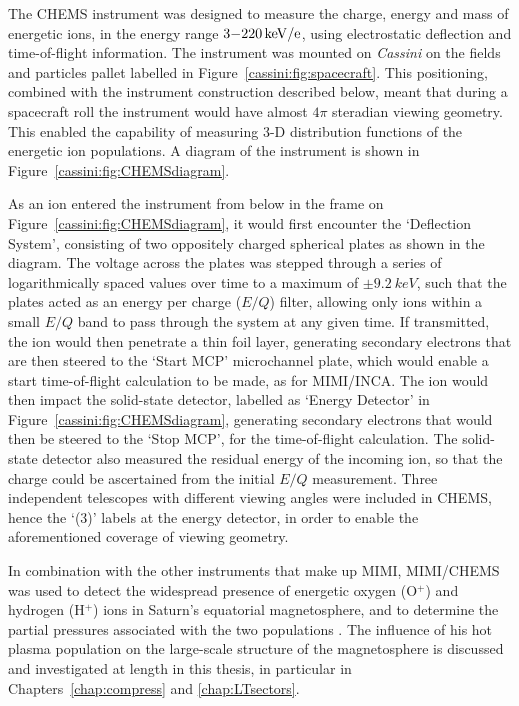 The CHEMS instrument was designed to measure the charge, energy and mass of energetic ions, in the energy range $3{\--}\SI{220}{keV/e}$, using electrostatic deflection and time-of-flight information. The instrument was mounted on \textit{Cassini} on the fields and particles pallet labelled in Figure~\ref{cassini:fig:spacecraft}. This positioning, combined with the instrument construction described below, meant that during a spacecraft roll the instrument would have almost $4\pi$ steradian viewing geometry. This enabled the capability of measuring 3-D distribution functions of the energetic ion populations. A diagram of the instrument is shown in Figure~\ref{cassini:fig:CHEMSdiagram}.

As an ion entered the instrument from below in the frame on Figure~\ref{cassini:fig:CHEMSdiagram}, it would first encounter the `Deflection System', consisting of two oppositely charged spherical plates as shown in the diagram. The voltage across the plates was stepped through a series of logarithmically spaced values over time to a maximum of $\pm\SI{9.2}{keV}$, such that the plates acted as an energy per charge ($E/Q$) filter, allowing only ions within a small $E/Q$ band to pass through the system at any given time. If transmitted, the ion would then penetrate a thin foil layer, generating secondary electrons that are then steered to the `Start MCP' microchannel plate, which would enable a start time-of-flight calculation to be made, as for MIMI/INCA. The ion would then impact the solid-state detector, labelled as `Energy Detector' in Figure~\ref{cassini:fig:CHEMSdiagram}, generating secondary electrons that would then be steered to the `Stop MCP', for the time-of-flight calculation. The solid-state detector also measured the residual energy of the incoming ion, so that the charge could be ascertained from the initial $E/Q$ measurement. Three independent telescopes with different viewing angles were included in CHEMS, hence the `(3)' labels at the energy detector, in order to enable the aforementioned coverage of viewing geometry.

In combination with the other instruments that make up MIMI, MIMI/CHEMS was used to detect the widespread presence of energetic oxygen (O$^+$) and hydrogen (H$^+$) ions in Saturn's equatorial magnetosphere, and to determine the partial pressures associated with the two populations \citep[e.g.][]{sergis2009}. The influence of his hot plasma population on the large-scale structure of the magnetosphere is discussed and investigated at length in this thesis, in particular in Chapters~\ref{chap:compress} and \ref{chap:LTsectors}.

